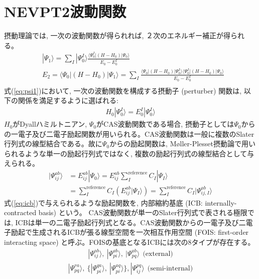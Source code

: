 \documentclass[11pt,pra,aps]{revtex4}
\begin{document}
\section{NEVPT2波動関数}

摂動理論では, 一次の波動関数が得られれば, ２次のエネルギー補正が得られる。
\begin{align}
  & |\Psi_1\rangle = \sum_I |\Psi_0^I\rangle\frac{\langle\Psi_0^I|\left(H-H_0\right)|\Psi_0\rangle}{E_0-E_0^I} \label{eq:psi1} \\
  & E_2 = \langle\Psi_0|\left(H-H_0\right)|\Psi_1\rangle = \sum_I \frac{\langle\Psi_0|\left(H-H_0\right)|\Psi_0^I\rangle\langle\Psi_0^I|\left(H-H_0\right)|\Psi_0\rangle}{E_0-E_0^I} \\
\end{align}
式(\ref{eq:psi1})において, 一次の波動関数を構成する摂動子 (perturber) 関数は, 以下の関係を満足するように選ばれる:
\begin{align}
  H_0|\Psi_0^I\rangle=E_0^I|\Psi_0^I\rangle \label{eq:eigen}
\end{align}
$H_0$がDyallハミルトニアン, $\Psi_0$がCAS波動関数である場合, 摂動子としては$\Psi_0$からの一電子及び二電子励起関数が用いられる。CAS波動関数は一般に複数のSlater行列式の線型結合である。故に$\Psi_0$からの励起関数は, M\o ller-Plesset摂動論で用いられるような単一の励起行列式ではなく, 複数の励起行列式の線型結合として与えられる。
\begin{align}
  |\Psi_{ij}^{ab}\rangle&=E_{ij}^{ab}|\Psi_0\rangle=E_{ij}^{ab}\sum_I^\text{reference} C_I|\Psi_I\rangle \nonumber \\
  &=\sum_I^\text{reference} C_I\left(E_{ij}^{ab}|\Psi_I\rangle\right)=\sum_I^\text{reference} C_I|\Psi_{ij,I}^{ab}\rangle \label{eq:icb}
\end{align}
式(\ref{eq:icb})で与えられるような励起関数を, 内部縮約基底 (ICB: internally-contracted basis) という。\cite{WMeyerMTC} CAS波動関数が単一のSlater行列式で表される極限では, ICBは単一の二電子励起行列式となる。CAS波動関数からの一電子及び二電子励起で生成されるICBが張る線型空間を一次相互作用空間 (FOIS: first-order interacting space) と呼ぶ。FOISの基底となるICBには次の8タイプが存在する。
\begin{align}
  |\Psi_{ij}^{ab}\rangle,\ |\Psi_{pi}^{ab}\rangle,\ |\Psi_{pq}^{ab}\rangle \ \ \text{(external)} \label{eq:ext}
\end{align}
\begin{align}
  |\Psi_{pq}^{ra}\rangle,\ \{|\Psi_{pi}^{qa}\rangle,\ |\Psi_{pi}^{aq}\rangle\}, |\Psi_{ij}^{pq}\rangle \ \ \text{(semi-internal)} \label{eq:semi-int}
\end{align}
\end{document}
